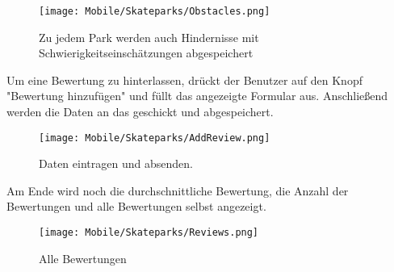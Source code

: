 \begin{figure}[H]
  \begin{center}
    \texttt{[image: Mobile/Skateparks/Obstacles.png]}
    \caption{Zu jedem Park werden auch Hindernisse mit Schwierigkeitseinschätzungen abgespeichert}
  \end{center}
\end{figure}

Um eine Bewertung zu hinterlassen, drückt der Benutzer auf den Knopf "Bewertung hinzufügen"{ }und
füllt das angezeigte Formular aus. Anschließend werden die Daten an das \underline{} geschickt
und abgespeichert.

\begin{figure}[H]
  \begin{center}
    \texttt{[image: Mobile/Skateparks/AddReview.png]}
    \caption{Daten eintragen und absenden.}
  \end{center}
\end{figure}

Am Ende wird noch die durchschnittliche Bewertung, die Anzahl der Bewertungen und alle Bewertungen
selbst angezeigt.

\begin{figure}[H]
  \begin{center}
    \texttt{[image: Mobile/Skateparks/Reviews.png]}
    \caption{Alle Bewertungen}
  \end{center}
\end{figure}
